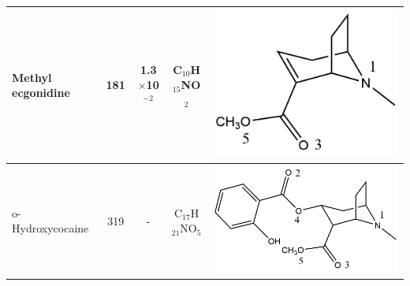 \begin{table}
\begin{tabular}{lcccc}
Methyl ecgonidine & 181& 1.3$\times$10$^{-2}$ & C$_{10}$H$_{15}$NO$_2$ & \begin{minipage}[c]{0.26\linewidth}\centering \includegraphics[width=0.8\linewidth]{pics/cocaine-chapter/ame_struct.png} \end{minipage}  \\ \midrule
o-Hydroxycocaine & 319 & - &C$_{17}$H$_{21}$NO$_5$ &  \begin{minipage}[c]{0.26\linewidth}\centering \includegraphics[width=\linewidth]{pics/cocaine-chapter/ohcocaine_struct.png} \end{minipage} \\ 
\bottomrule
\end{tabular}
\label{tab:structs}
\end{table}

